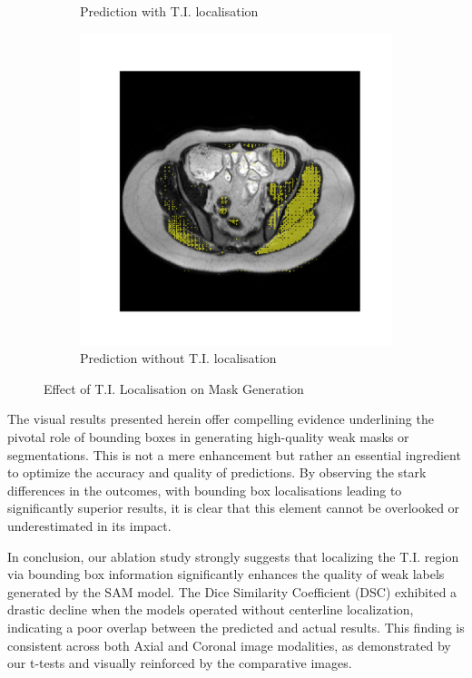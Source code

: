 \begin{figure}[H]
\begin{subfigure}[b]{0.47\textwidth}
\caption{Prediction with T.I. localisation}
\label{fig:2}
\end{subfigure}
\hfill
\begin{subfigure}[b]{0.47\textwidth}
\centering
\includegraphics[width=\textwidth]{./figures/ablation_without_loc.png}
\caption{Prediction without T.I. localisation}
\label{fig:3}
\end{subfigure}
\caption{Effect of T.I. Localisation on Mask Generation}
\label{fig:4}
\end{figure}

The visual results presented herein offer compelling evidence underlining the pivotal role of bounding boxes in generating high-quality weak masks or segmentations. This is not a mere enhancement but rather an essential ingredient to optimize the accuracy and quality of predictions. By observing the stark differences in the outcomes, with bounding box localisations leading to significantly superior results, it is clear that this element cannot be overlooked or underestimated in its impact.

In conclusion, our ablation study strongly suggests that localizing the T.I. region via bounding box information significantly enhances the quality of weak labels generated by the SAM model. The Dice Similarity Coefficient (DSC) exhibited a drastic decline when the models operated without centerline localization, indicating a poor overlap between the predicted and actual results. This finding is consistent across both Axial and Coronal image modalities, as demonstrated by our t-tests and visually reinforced by the comparative images.

